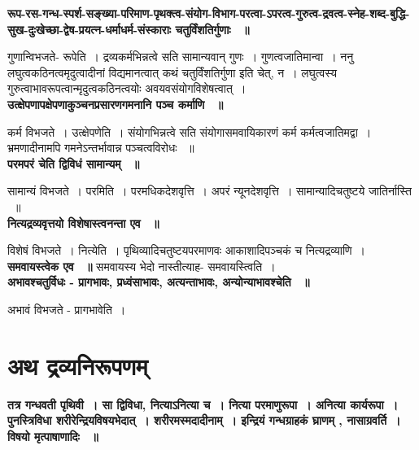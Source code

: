 	{\bfseries रूप-रस-गन्ध-स्पर्श-सङ्ख्या-परिमाण-पृथक्‍त्व-संयोग-विभाग-परत्वा-ऽपरत्व-गुरुत्व-द्रवत्व-स्‍नेह-शब्द-बुद्धि-सुख-दुःखेच्छा-द्वेष-प्रयत्‍न-धर्माधर्म-संस्काराः चतुर्विंशतिर्गुणाः ~॥}\par
		गुणान्विभजते- रूपेति~। द्रव्यकर्मभिन्नत्वे सति सामान्यवान् गुणः~। गुणत्वजातिमान्वा~। ननु लघुत्वकठिनत्वमृदुत्वादीनां विद्यमानत्वात् कथं चतुर्विंशतिर्गुणा इति चेत्, न~। लघुत्वस्य गुरुत्वाभावरूपत्वान्मृदुत्वकठिनत्वयोः अवयवसंयोगविशेषत्वात्~।\\[10pt]
	{\bfseries उत्क्षेपणापक्षेपणाकुञ्चनप्रसारणगमनानि पञ्च कर्माणि ~॥}\par
		कर्म विभजते~। उत्क्षेपणेति~। संयोगभिन्नत्वे सति संयोगासमवायिकारणं कर्म कर्मत्वजातिमद्वा~। भ्रमणादीनामपि गमनेऽन्तर्भावान्न पञ्चत्वविरोधः ~॥\\[10pt]
	{\bfseries परमपरं चेति द्विविधं सामान्यम् ~॥}\par
		सामान्यं विभजते~। परमिति~। परमधिकदेशवृत्ति~। अपरं न्यूनदेशवृत्ति~। सामान्यादिचतुष्टये जातिर्नास्ति ~॥\\[10pt]
	{\bfseries नित्यद्रव्यवृत्तयो विशेषास्त्वनन्ता एव ~॥}\par
		विशेषं विभजते~। नित्येति~। पृथिव्यादिचतुष्टयपरमाणवः आकाशादिपञ्चकं च नित्यद्रव्याणि~।\\[10pt]
	{\bfseries समवायस्त्वेक एव ~॥}
		समवायस्य भेदो नास्तीत्याह- समवायस्त्विति~।\\[10pt]
	{\bfseries अभावश्चतुर्विधः - प्रागभावः, प्रध्वंसाभावः, अत्यन्ताभावः, अन्योन्याभावश्चेति ~॥}\par
		अभावं विभजते - प्रागभावेति~। \section*{अथ द्रव्यनिरूपणम्}
	{\bfseries तत्र गन्धवती पृथिवी~। सा द्विविधा, नित्याऽनित्या च~। नित्या परमाणुरूपा~। अनित्या कार्यरूपा~। पुनस्त्रिविधा शरीरेन्द्रियविषयभेदात्~। शरीरमस्मदादीनाम्~। इन्द्रियं गन्धग्राहकं घ्राणम् , नासाग्रवर्ति~। विषयो मृत्पाषाणादिः ~॥}\par
